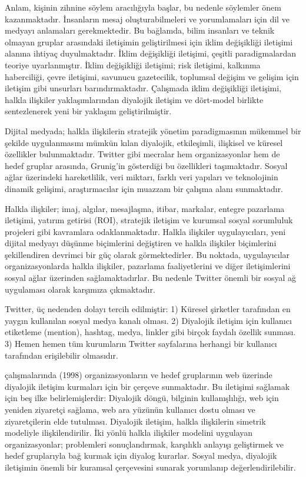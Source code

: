 \documentclass[
]{book}
\begin{document}
Anlam, kişinin zihnine söylem aracılığıyla başlar, bu nedenle söylemler önem kazanmaktadır. İnsanların mesaj oluşturabilmeleri ve yorumlamaları için dil ve medyayı anlamaları gerekmektedir. \citep{jurin2010environmental} Bu bağlamda, bilim insanları ve teknik olmayan gruplar arasındaki iletişimin geliştirilmesi için iklim değişikliği iletişimi alanına ihtiyaç duyulmaktadır. İklim değişikliği iletişimi, çeşitli paradigmalardan teoriye uyarlanmıştır. İklim değişikliği iletişimi; risk iletişimi, kalkınma haberciliği, çevre iletişimi, savunucu gazetecilik, toplumsal değişim ve gelişim için iletişim gibi unsurları barındırmaktadır. \citep{evans2018communicating} Çalışmada iklim değişikliği iletişimi, halkla ilişkiler yaklaşımlarından diyalojik iletişim ve dört-model birlikte sentezlenerek yeni bir yaklaşım geliştirilmiştir.

Dijital medyada; halkla ilişkilerin stratejik yönetim paradigmasının mükemmel bir şekilde uygulanmasını mümkün kılan diyalojik, etkileşimli, ilişkisel ve küresel özellikler bulunmaktadır. \citep{grunig2009paradigms} Twitter gibi mecralar hem organizasyonlar hem de hedef gruplar arasında, Grunig'in gösterdiği bu özellikleri taşımaktadır. Sosyal ağlar üzerindeki hareketlilik, veri miktarı, farklı veri yapıları ve teknolojinin dinamik gelişimi, araştırmacılar için muazzam bir çalışma alanı sunmaktadır.

Halkla ilişkiler; imaj, algılar, mesajlaşma, itibar, markalar, entegre pazarlama iletişimi, yatırım getirisi (ROI), stratejik iletişim ve kurumsal sosyal sorumluluk projeleri gibi kavramlara odaklanmaktadır. Halkla ilişkiler uygulayıcıları, yeni dijital medyayı düşünme biçimlerini değiştiren ve halkla ilişkiler biçimlerini şekillendiren devrimci bir güç olarak görmektedirler. \citep{grunig2009paradigms} Bu noktada, uygulayıcılar organizasyonlarda halkla ilişkiler, pazarlama faaliyetlerini ve diğer iletişimlerini sosyal ağlar üzerinden sağlamaktadırlar. Bu nedenle Twitter önemli bir sosyal ağ uygulaması olarak karşımıza çıkmaktadır.

Twitter, üç nedenden dolayı tercih edilmiştir: 1) Küresel şirketler tarafından en yaygın kullanılan sosyal medya kanalı olması. 2) Diyalojik iletişim için kullanıcı etiketleme (mention), hashtag, medya, linkler gibi birçok faydalı özellik sunması. 3) Hemen hemen tüm kurumların Twitter sayfalarına herhangi bir kullanıcı tarafından erişilebilir olmasıdır.

\citet{kent1998building} çalışmalarında (1998) organizasyonların ve hedef gruplarının web üzerinde diyalojik iletişim kurmaları için bir çerçeve sunmaktadır. Bu iletişimi sağlamak için beş ilke belirlemişlerdir: Diyalojik döngü, bilginin kullanışlılığı, web için yeniden ziyaretçi sağlama, web ara yüzünün kullanıcı dostu olması ve ziyaretçilerin elde tutulması. Diyalojik iletişim, halkla ilişkilerin simetrik modeliyle ilişkilendirilir. İki yönlü halkla ilişkiler modelini uygulayan organizasyonlar; problemleri sonuçlandırmak, karşılıklı anlayışı geliştirmek ve hedef gruplarıyla bağ kurmak için diyalog kurarlar. Sosyal medya, diyalojik iletişimin önemli bir kuramsal çerçevesini sunarak yorumlanıp değerlendirilebilir.
\end{document}
